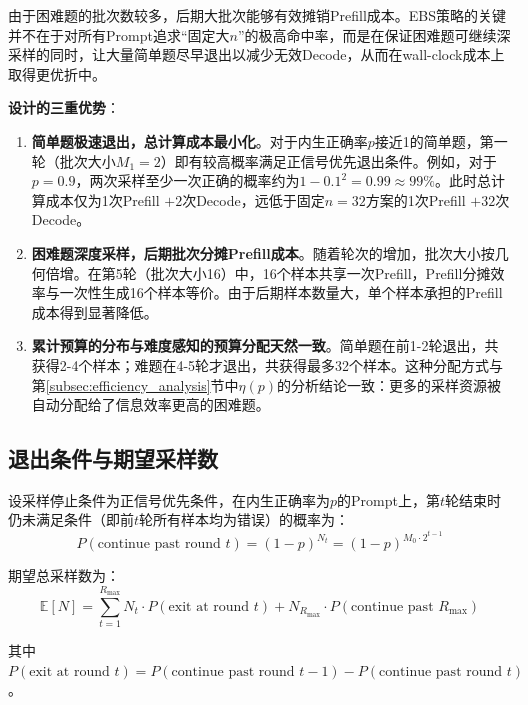 由于困难题的批次数较多，后期大批次能够有效摊销Prefill成本。EBS策略的关键并不在于对所有Prompt追求“固定大$n$”的极高命中率，而是在保证困难题可继续深采样的同时，让大量简单题尽早退出以减少无效Decode，从而在wall-clock成本上取得更优折中。

\textbf{设计的三重优势}：

\begin{enumerate}
    \item \textbf{简单题极速退出，总计算成本最小化}。对于内生正确率$p$接近1的简单题，第一轮（批次大小$M_1 = 2$）即有较高概率满足正信号优先退出条件。例如，对于$p = 0.9$，两次采样至少一次正确的概率约为$1 - 0.1^2 = 0.99 \approx 99\%$。此时总计算成本仅为1次Prefill $+ 2$次Decode，远低于固定$n = 32$方案的1次Prefill $+ 32$次Decode。
    
    \item \textbf{困难题深度采样，后期批次分摊Prefill成本}。随着轮次的增加，批次大小按几何倍增。在第5轮（批次大小16）中，16个样本共享一次Prefill，Prefill分摊效率与一次性生成16个样本等价。由于后期样本数量大，单个样本承担的Prefill成本得到显著降低。
    
    \item \textbf{累计预算的分布与难度感知的预算分配天然一致}。简单题在前1-2轮退出，共获得2-4个样本；难题在4-5轮才退出，共获得最多32个样本。这种分配方式与第\ref{subsec:efficiency_analysis}节中$\eta(p)$的分析结论一致：更多的采样资源被自动分配给了信息效率更高的困难题。
\end{enumerate}

\subsection{退出条件与期望采样数}
\label{subsec:expected_samples}

设采样停止条件为正信号优先条件，在内生正确率为$p$的Prompt上，第$t$轮结束时仍未满足条件（即前$t$轮所有样本均为错误）的概率为：
\begin{equation}
P(\text{continue past round } t) = (1-p)^{N_t} = (1-p)^{M_0 \cdot 2^{t-1}}
\label{eq:continue_probability}
\end{equation}

期望总采样数为：
\begin{equation}
\mathbb{E}[N] = \sum_{t=1}^{R_{\max}} N_t \cdot P(\text{exit at round } t) + N_{R_{\max}} \cdot P(\text{continue past } R_{\max})
\label{eq:expected_total_samples}
\end{equation}

其中$P(\text{exit at round } t) = P(\text{continue past round } t-1) - P(\text{continue past round } t)$。

